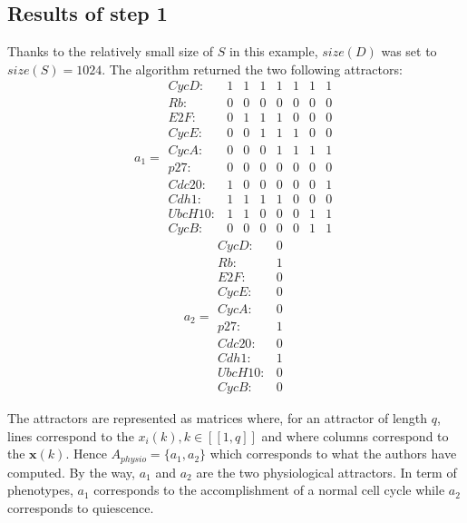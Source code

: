\documentclass[oneside,a4paper,onecolumn,notitlepage]{article}
\begin{document}
\subsection{Results of step 1}
Thanks to the relatively small size of $S$ in this example, $size(D)$ was set to $size(S)=1024$. The algorithm returned the two following attractors:
\begin{equation*}
a_{1}=
\begin{matrix}
CycD:&1&1&1&1&1&1&1\\
Rb:&0&0&0&0&0&0&0\\
E2F:&0&1&1&1&0&0&0\\
CycE:&0&0&1&1&1&0&0\\
CycA:&0&0&0&1&1&1&1\\
p27:&0&0&0&0&0&0&0\\
Cdc20:&1&0&0&0&0&0&1\\
Cdh1:&1&1&1&1&0&0&0\\
UbcH10:&1&1&0&0&0&1&1\\
CycB:&0&0&0&0&0&1&1
\end{matrix}
\end{equation*}
\begin{equation*}
a_{2}=
\begin{matrix}
CycD:&0\\
Rb:&1\\
E2F:&0\\
CycE:&0\\
CycA:&0\\
p27:&1\\
Cdc20:&0\\
Cdh1:&1\\
UbcH10:&0\\
CycB:&0
\end{matrix}
\end{equation*}

The attractors are represented as matrices where, for an attractor of length $q$, lines correspond to the $x_i(k), k\in [\![1,q]\!]$ and where columns correspond to the $\boldsymbol{x}(k)$.
Hence $A_{physio}=\lbrace a_{1},a_{2}\rbrace$ which corresponds to what the authors have computed. By the way, $a_{1}$ and $a_{2}$ are the two physiological attractors. In term of phenotypes, $a_{1}$ corresponds to the accomplishment of a normal cell cycle while $a_{2}$ corresponds to quiescence.
\end{document}
